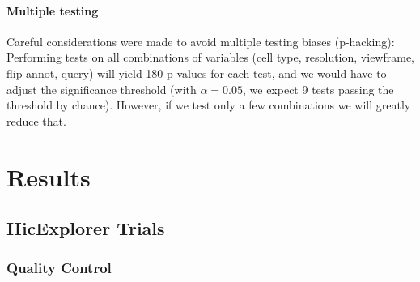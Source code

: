 \documentclass[
  11pt,
  a4paper,
]{scrbook}
\begin{document}
\subsubsection{Multiple testing}\label{multiple-testing}

Careful considerations were made to avoid multiple testing biases
(p-hacking): Performing tests on all combinations of variables (cell
type, resolution, viewframe, flip annot, query) will yield 180 p-values
for each test, and we would have to adjust the significance threshold
(with \(\alpha = 0.05\), we expect 9 tests passing the threshold by
chance). However, if we test only a few combinations we will greatly
reduce that.

\chapter{Results}\label{results}

\section{HicExplorer Trials}\label{hicexplorer-trials-1}

\subsection{Quality Control}\label{quality-control}
\end{document}
